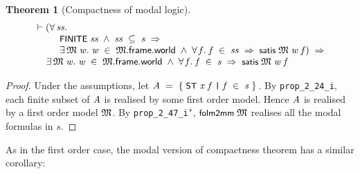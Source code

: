 \documentclass[letterpaper]{article}
\newtheorem{thm}{Theorem}
\renewcommand{\HOLConst}[1]{{\textsf{\upshape\small #1}}}
\renewcommand{\HOLinline}[1]{\ensuremath{#1}}
\newenvironment{holmath}{\begin{displaymath}\begin{array}{l}}{\end{array}\end{displaymath}\ignorespacesafterend}
\begin{document}
\begin{thm}[Compactness of modal logic]
\begin{holmath}
  \ensuremath{\HOLTokenTurnstile}(\HOLSymConst{\HOLTokenForall{}}\HOLBoundVar{ss}.\\
\;\;\;\;\;\;\;\;\;\;\HOLConst{FINITE}\;\HOLBoundVar{ss}\;\HOLSymConst{\HOLTokenConj{}}\;\HOLBoundVar{ss}\;\HOLSymConst{\HOLTokenSubset{}}\;\HOLFreeVar{s}\;\HOLSymConst{\HOLTokenImp{}}\\
\;\;\;\;\;\;\;\;\;\;\HOLSymConst{\HOLTokenExists{}}\HOLBoundVar{\ensuremath{\mathfrak{M}}}\;\HOLBoundVar{w}.\;\HOLBoundVar{w}\;\HOLSymConst{\HOLTokenIn{}}\;\HOLBoundVar{\ensuremath{\mathfrak{M}}}.\HOLFieldName{frame}.\HOLFieldName{world}\;\HOLSymConst{\HOLTokenConj{}}\;\HOLSymConst{\HOLTokenForall{}}\HOLBoundVar{f}.\;\HOLBoundVar{f}\;\HOLSymConst{\HOLTokenIn{}}\;\HOLBoundVar{ss}\;\HOLSymConst{\HOLTokenImp{}}\;\HOLConst{satis}\;\HOLBoundVar{\ensuremath{\mathfrak{M}}}\;\HOLBoundVar{w}\;\HOLBoundVar{f})\;\HOLSymConst{\HOLTokenImp{}}\\
\;\;\;\;\;\HOLSymConst{\HOLTokenExists{}}\HOLBoundVar{\ensuremath{\mathfrak{M}}}\;\HOLBoundVar{w}.\;\HOLBoundVar{w}\;\HOLSymConst{\HOLTokenIn{}}\;\HOLBoundVar{\ensuremath{\mathfrak{M}}}.\HOLFieldName{frame}.\HOLFieldName{world}\;\HOLSymConst{\HOLTokenConj{}}\;\HOLSymConst{\HOLTokenForall{}}\HOLBoundVar{f}.\;\HOLBoundVar{f}\;\HOLSymConst{\HOLTokenIn{}}\;\HOLFreeVar{s}\;\HOLSymConst{\HOLTokenImp{}}\;\HOLConst{satis}\;\HOLBoundVar{\ensuremath{\mathfrak{M}}}\;\HOLBoundVar{w}\;\HOLBoundVar{f}
\end{holmath}
\end{thm}
\begin{proof}
Under the assumptions, let \HOLinline{\HOLFreeVar{A}\;\HOLSymConst{=}\;\HOLTokenLeftbrace{}\HOLConst{ST}\;\HOLFreeVar{x}\;\HOLBoundVar{f}\;\HOLTokenBar{}\;\HOLBoundVar{f}\;\HOLSymConst{\HOLTokenIn{}}\;\HOLFreeVar{s}\HOLTokenRightbrace{}}. By \texttt{prop_2_24_i}, each finite subset of \HOLinline{\HOLFreeVar{A}} is realised by some first order model. Hence \HOLinline{\HOLFreeVar{A}} is realised by a first order model \HOLinline{\HOLFreeVar{\ensuremath{\mathfrak{M}}}}. By \texttt{prop_2_47_i'}, \HOLinline{\HOLConst{folm2mm}\;\HOLFreeVar{\ensuremath{\mathfrak{M}}}} realises all the modal formulas in $s$.

\end{proof}

As in the first order case, the modal version of compactness theorem has a similar corollary:
\end{document}
